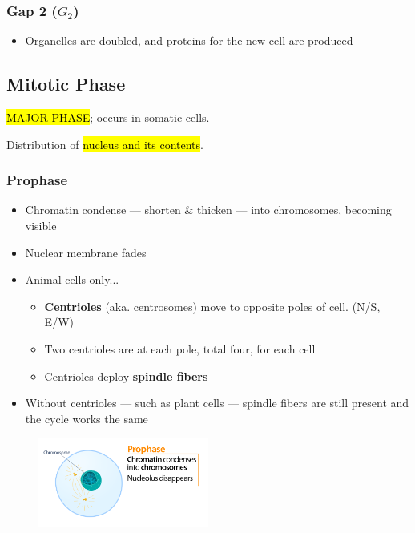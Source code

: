 \documentclass[a4paper,12pt]{article}
\begin{document}
\subsubsection{Gap 2 ($G_2$)}
\begin{itemize}
    \item{Organelles are doubled, and proteins for the new cell are produced}
\end{itemize}

\subsection{Mitotic Phase}\noindent

\hl{MAJOR PHASE}; occurs in somatic cells.

Distribution of \hl{nucleus and its contents}.

\subsubsection{Prophase}
\begin{itemize}
    \item{Chromatin condense --- shorten \& thicken --- into chromosomes, becoming visible}
    \item{Nuclear membrane fades}
    \item{
            Animal cells only...
            \begin{itemize}
                \item{\textbf{Centrioles} (aka. centrosomes) move to opposite poles of cell. (N/S, E/W)}
                \item{Two centrioles are at each pole, total four, for each cell}
                \item{Centrioles deploy \textbf{spindle fibers}}
            \end{itemize}
        }
    \item{Without centrioles --- such as plant cells --- spindle fibers are still present and the cycle works the same}
\end{itemize}

\begin{figure}[H]
    \centering
    \includegraphics[width=0.5\textwidth]{prophase}
\end{figure}
\end{document}
